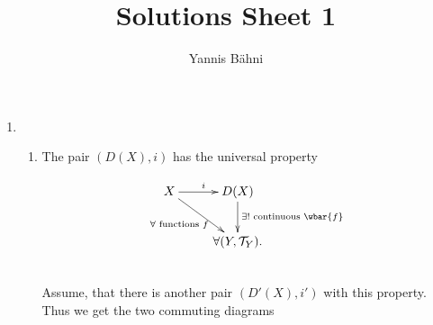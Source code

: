 

\title{Solutions Sheet 1}
\author{Yannis B\"{a}hni}
\address[Yannis B\"{a}hni]{University of Zurich, R\"{a}mistrasse 71, 8006 Zurich}


\maketitle
\thispagestyle{fancy}

\begin{enumerate}[label = \textbf{Exercise \arabic*.},wide = 0pt, itemsep=1.5ex]
	\item \label{exercise_1}~
		\begin{enumerate}[label = \textup{(}\alph*\textup{)}]
			\item The pair $(D(X),i)$ has the universal property
				\begin{figure}[h!tb]
					\begin{displaymath}
    					\xymatrix{X \ar[r]^i\ar[dr]_{\forall \text{ functions } f} & D(X) \ar[d]^{\exists ! \text{ continuous } \wbar{f}}\\
						 & \forall (Y,\Tcal_Y).}
					\end{displaymath}
				\end{figure}\\
				Assume, that there is another pair $(D'(X),i')$ with this property. Thus we get the two commuting diagrams


\end{enumerate}
\end{enumerate}

